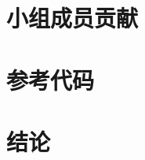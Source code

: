 \documentclass[journal,transmag]{IEEEtran}
\begin{document}
\section{小组成员贡献}

\section{参考代码}

\section{结论}



%
%



%
%
\end{document}
